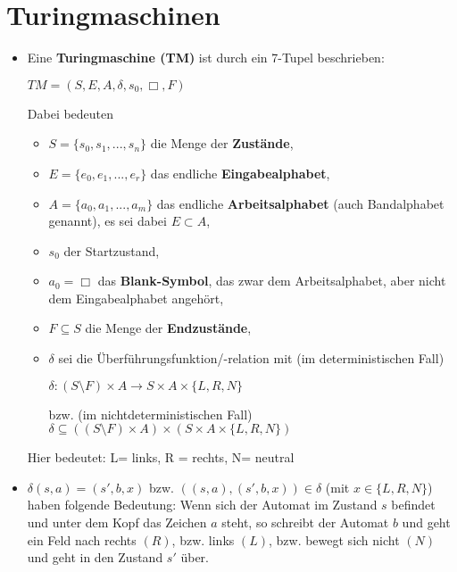 \documentclass[12pt, a4paper]{article}
\begin{document}
	\section{Turingmaschinen}
	\begin{itemize}
		\item Eine \textbf{Turingmaschine (TM)} ist durch ein 7-Tupel beschrieben:
		\begin{center}
			$TM = (S, E, A, \delta, s_{0}, \Box, F)$
		\end{center}
		
		\subitem Dabei bedeuten
		\begin{itemize}
			\item $S = \{s_{0},s_{1},...,s_{n}\}$ die Menge der \textbf{Zustände},
			
			\item $E = \{e_{0},e_{1},...,e_{r}\}$ das endliche \textbf{Eingabealphabet},
			
			\item $A = \{a_{0},a_{1},...,a_{m}\}$ das endliche \textbf{Arbeitsalphabet} (auch Bandalphabet genannt), es sei dabei $E \subset A$,
			
			\item $s_{0}$ der Startzustand,
			
			\item $a_{0}=\Box$ das \textbf{Blank-Symbol}, das zwar dem Arbeitsalphabet, aber nicht dem Eingabealphabet angehört,
			
			\item $F\subseteq S$ die Menge der \textbf{Endzustände},
			
			\item $\delta$ sei die Überführungsfunktion/-relation mit (im deterministischen Fall)
			\begin{center}
				$\delta: (S\setminus F) \times A\rightarrow S\times A\times \{L, R, N\}$
			\end{center}
			\subitem bzw. (im nichtdeterministischen Fall) $\delta\subseteq ((S\setminus F)\times A)\times (S\times A\times \{L, R, N\})$
		\end{itemize}
		\subitem Hier bedeutet: L= links, R = rechts, N= neutral
		
		\item $\delta(s, a) = (s', b, x)$ bzw. $((s, a), (s', b, x)) \in \delta$ (mit $x \in\{L, R, N\}$) haben folgende Bedeutung:
			\subitem Wenn sich der Automat im Zustand $s$ befindet und unter dem Kopf das Zeichen $a$ steht, so schreibt der Automat $b$ und geht ein Feld nach rechts $(R)$, bzw. links $(L)$, bzw. bewegt sich nicht $(N)$ und geht in den Zustand $s'$ über.
			

\end{itemize}
\end{document}

